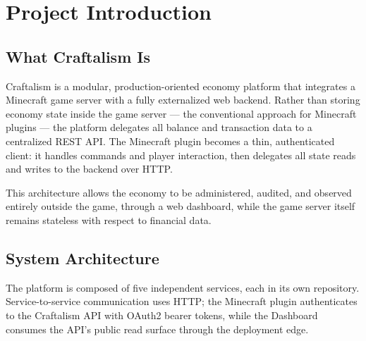 
\chapter*{Project Introduction}

\section*{What Craftalism Is}

Craftalism is a modular, production-oriented economy platform that integrates a Minecraft game server with a fully externalized web backend. Rather than storing economy state inside the game server — the conventional approach for Minecraft plugins — the platform delegates all balance and transaction data to a centralized REST API. The Minecraft plugin becomes a thin, authenticated client: it handles commands and player interaction, then delegates all state reads and writes to the backend over HTTP.

This architecture allows the economy to be administered, audited, and observed entirely outside the game, through a web dashboard, while the game server itself remains stateless with respect to financial data.

\section*{System Architecture}

The platform is composed of five independent services, each in its own repository. Service-to-service communication uses HTTP; the Minecraft plugin authenticates to the Craftalism API with OAuth2 bearer tokens, while the Dashboard consumes the API's public read surface through the deployment edge.

